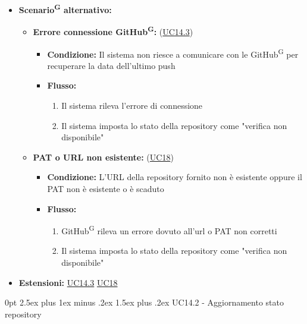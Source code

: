 \documentclass[a4paper, 11pt]{article}
\makeatletter
\renewcommand\paragraph{\@startsection{paragraph}{4}
  {0pt}
  {2.5ex plus 1ex minus .2ex}
  {1.5ex plus .2ex}
  {\normalfont\normalsize\bfseries\color{AccentDark}}}
\makeatother
\begin{document}
\begin{itemize}
	\item \textbf{Scenario\textsuperscript{G} alternativo:}
	\begin{itemize}
		\item \textbf{Errore connessione GitHub\textsuperscript{G}:} (\hyperref[UC14.3]{UC14.3})
		\begin{itemize}
			\item \textbf{Condizione:} Il sistema non riesce a comunicare con le GitHub\textsuperscript{G} per recuperare la data dell'ultimo push
			\item \textbf{Flusso:}
			\begin{enumerate}
				\item Il sistema rileva l'errore di connessione
				\item Il sistema imposta lo stato della repository come "verifica non disponibile"
			\end{enumerate}
		\end{itemize}
		\item \textbf{PAT o URL non esistente: } (\hyperref[UC18]{UC18})
		\begin{itemize}
			\item \textbf{Condizione:} L’URL della repository fornito non è esistente oppure il PAT non è esistente o è scaduto
			\item \textbf{Flusso: }
			\begin{enumerate}
				\item GitHub\textsuperscript{G} rileva un errore dovuto all'url o PAT non corretti
				\item Il sistema imposta lo stato della repository come "verifica non disponibile"
			\end{enumerate}
		\end{itemize}
	\end{itemize}
	\item \textbf{Estensioni:} \hyperref[UC14.3]{UC14.3} \hyperref[UC18]{UC18}

\end{itemize}


\paragraph{UC14.2 - Aggiornamento stato repository} \label{UC14.2}
\end{document}
